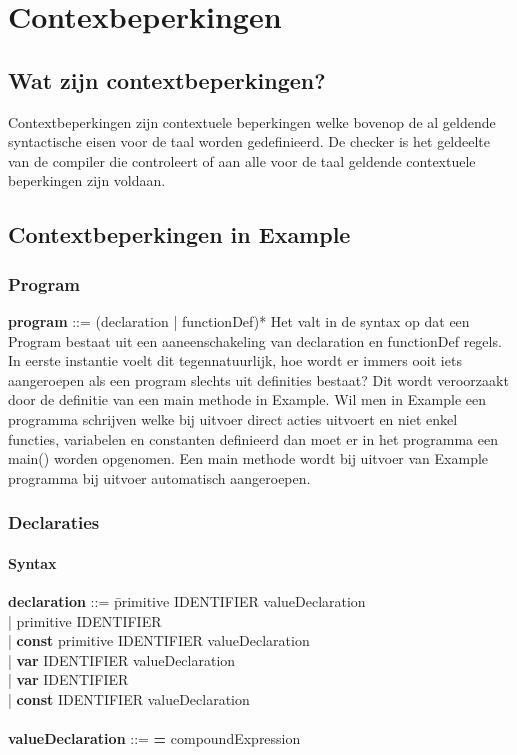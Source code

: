 \chapter{Contexbeperkingen}
\section{Wat zijn contextbeperkingen?}
Contextbeperkingen zijn contextuele beperkingen welke bovenop de al geldende syntactische eisen voor de taal worden gedefinieerd. De checker is het geldeelte van de compiler die controleert of aan alle voor de taal geldende contextuele beperkingen zijn voldaan.

\section{Contextbeperkingen in Example}
\subsection{Program}
{\bf program}                     ::= (declaration | functionDef)*
Het valt in de syntax op dat een Program bestaat uit een aaneenschakeling van declaration en functionDef regels. In eerste instantie voelt dit tegennatuurlijk, hoe wordt er immers ooit iets aangeroepen als een program slechts uit definities bestaat? Dit wordt veroorzaakt door de definitie van een main methode in Example. Wil men in Example een programma schrijven welke bij uitvoer direct acties uitvoert en niet enkel functies, variabelen en constanten definieerd dan moet er in het programma een main() worden opgenomen. Een main methode wordt bij uitvoer van Example programma bij uitvoer automatisch aangeroepen.

\subsection{Declaraties}
    \subsubsection{Syntax}    
        \begin{tabbing}
            {\bf declaration}         ::= \=primitive IDENTIFIER valueDeclaration\\
                                      \>| primitive IDENTIFIER\\
                                      \>| \textbf{const} primitive IDENTIFIER valueDeclaration\\
                                      \>| \textbf{var} IDENTIFIER valueDeclaration\\
                                      \>| \textbf{var} IDENTIFIER\\
                                      \>| \textbf{const} IDENTIFIER valueDeclaration\\
            \\
            {\bf valueDeclaration}    ::= \textbf{=} compoundExpression\\
        \end{tabbing}

